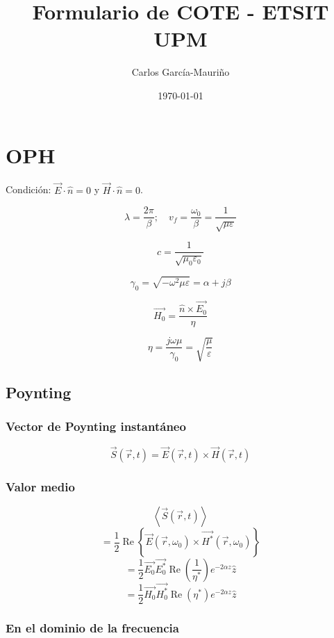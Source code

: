 \documentclass[12pt,a4paper]{article}
\title{Formulario de COTE - ETSIT UPM}
\author{Carlos García-Mauriño}
\date{\today}
\begin{document}
\maketitle

\twocolumn

\section{OPH}
\label{sec:ondas_planas_homogeneas}

Condición: $ \vec{E} \cdot \hat{n} = 0 $ y $ \vec{H} \cdot \hat{n} = 0 $.

\[ \lambda = \frac{2 \pi}{\beta}; \quad v_f = \frac{\omega_0}{\beta}  =
\frac{1}{\sqrt{\mu \varepsilon}} \]

\[ c = \frac{1}{\sqrt{\mu_0 \varepsilon_0}} \]

\[ \gamma_0 = \sqrt{-\omega^2 \mu \varepsilon} = \alpha + j \beta \]

\[ \vec{H_0} = \frac{\hat{n} \times \vec{E_0}}{\eta} \]

\[ \eta = \frac{j \omega \mu}{\gamma_0} = \sqrt{\frac{\mu}{\varepsilon}} \]

\subsection{Poynting}
\label{sub:poynting}

\subsubsection{Vector de Poynting instantáneo}
\label{ssub:vector_de_poynting_instantaneo}


\[ \vec{S} ( \vec{r}, t ) = \vec{E} ( \vec{r}, t ) \times \vec{H} ( \vec{r}, t
) \]

\subsubsection{Valor medio}
\label{ssub:valor_medio}

\[ \left< \vec{S} ( \vec{r}, t ) \right> \]
\[ = \frac{1}{2} \operatorname{Re}\left\{ \vec{E}( \vec{r}, \omega_0 ) \times
\vec{H^*} ( \vec{r}, \omega_0)  \right\} \]
\[ = \frac{1}{2} \vec{E_0} \vec{E_0^*} \operatorname{Re}\left( \frac{1}{\eta^*}
\right) e^{-2 \alpha z} \hat{z} \]
\[ = \frac{1}{2} \vec{H_0} \vec{H_0^*} \operatorname{Re}\left( \eta^* \right)
e^{-2 \alpha z} \hat{z} \]

\subsubsection{En el dominio de la frecuencia}
\label{ssub:en_el_dominio_de_la_frecuencia}
\end{document}
